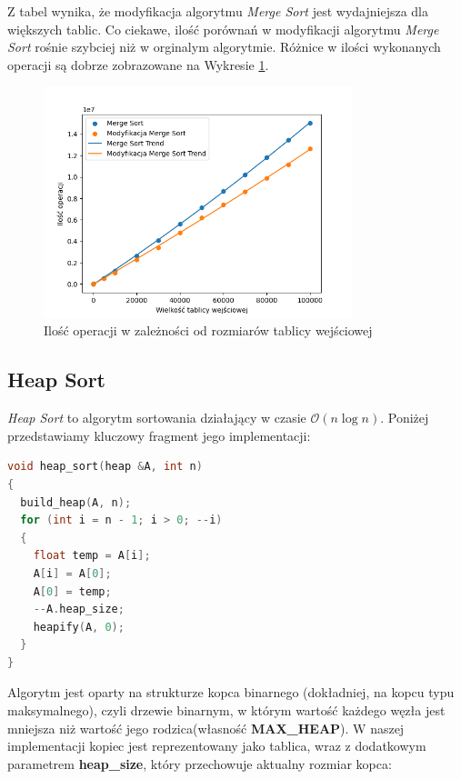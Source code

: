 \documentclass{article}
\newcommand{\bigO}{\mathcal{O}}
\begin{document}
Z tabel wynika, że modyfikacja algorytmu \textit{Merge Sort} jest wydajniejsza dla większych tablic. Co ciekawe, ilość porównań w modyfikacji algorytmu \textit{Merge Sort} rośnie szybciej niż w orginalym algorytmie. Różnice w ilości wykonanych operacji są dobrze zobrazowane na Wykresie \ref{fig:merge}.

\begin{figure}[H]
    \centering
    \includegraphics[width=0.8\textwidth]{Figure_2.png}
    \caption{Ilość operacji w zależności od rozmiarów tablicy wejściowej}
    \label{fig:merge}
\end{figure}
\subsection{Heap Sort}
\textit{Heap Sort} to algorytm sortowania działający w czasie $\bigO (n \log n)$. Poniżej przedstawiamy kluczowy fragment jego implementacji:
\begin{lstlisting}[style=mystyle, language=C++, caption={Implementacja \texttt{Heap Sort}}, label={lst:heapsort}]
void heap_sort(heap &A, int n)
{
  build_heap(A, n);
  for (int i = n - 1; i > 0; --i)
  {
    float temp = A[i];
    A[i] = A[0];
    A[0] = temp;
    --A.heap_size;
    heapify(A, 0);
  }
}
\end{lstlisting}
Algorytm jest oparty na strukturze kopca binarnego (dokładniej, na kopcu typu maksymalnego), czyli drzewie binarnym, w którym wartość każdego węzła jest mniejsza niż wartość jego rodzica(własność \textbf{MAX\_HEAP}). W naszej implementacji kopiec jest reprezentowany jako tablica, wraz z dodatkowym parametrem \textbf{heap\_size}, który przechowuje aktualny rozmiar kopca:

\newpage
\end{document}
